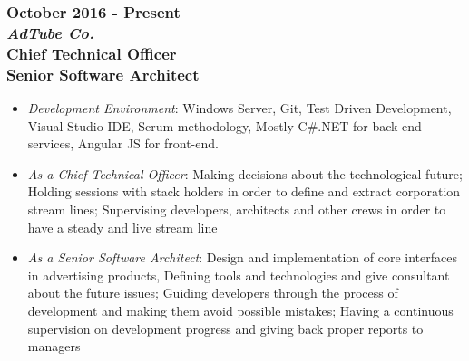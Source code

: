 \documentclass[10pt,a4paper]{article}
\begin{document}
\subsubsection{{October 2016 - Present} \\ \textnormal {\textit {AdTube Co.}} \\ {Chief Technical Officer \\ Senior Software Architect}}
  \setlength{\leftskip}{0.5cm}
  \setlength{\rightskip}{1cm}
  \begin{itemize}
    \setlength{\rightskip}{1cm}
    \setlength\itemsep{0em}
    \item \small \textit {Development Environment}: Windows Server, Git, Test Driven Development, Visual Studio IDE, Scrum methodology, Mostly C\#.NET for back-end services, Angular JS for front-end.
    \item \small \textit {As a Chief Technical Officer}: Making decisions about the technological future; Holding sessions with stack holders in order to define and extract corporation stream lines; Supervising developers, architects and other crews in order to have a steady and live stream line
    \item \small \textit {As a Senior Software Architect}: Design and implementation of core interfaces in advertising products, Defining tools and technologies and give consultant about the future issues; Guiding developers through the process of development and making them avoid possible mistakes; Having a continuous supervision on development progress and giving back proper reports to managers
  \end{itemize}
  \setlength{\leftskip}{0pt}
  \setlength{\rightskip}{0cm}
  
\end{document}
